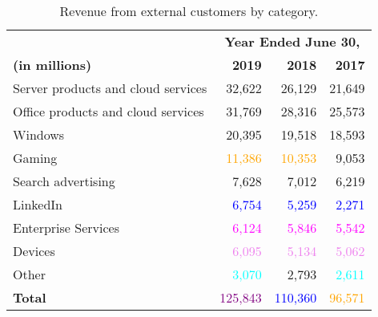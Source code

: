 \documentclass{article}
\begin{document}
\begin{table}[h]
    \centering
    \renewcommand{\arraystretch}{1.2}
    \begin{tabular}{lrrr}
        \toprule
        & \multicolumn{3}{c}{\textbf{Year Ended June 30,}} \\
        \textbf{(in millions)}& \textbf{2019} & \textbf{2018} & \textbf{2017} \\
        \midrule
        Server products and cloud services & 32,622 & 26,129 & 21,649 \\
        Office products and cloud services & 31,769 & 28,316 & 25,573 \\
        Windows & 20,395 & 19,518 & 18,593 \\
        Gaming & \textcolor{orange}{11,386} & \textcolor{orange}{10,353} & 9,053 \\
        Search advertising & 7,628 & 7,012 & 6,219 \\
        LinkedIn & \textcolor{blue}{6,754} & \textcolor{blue}{5,259} & \textcolor{blue}{2,271} \\
        Enterprise Services & \textcolor{magenta}{6,124} & \textcolor{magenta}{5,846} & \textcolor{magenta}{5,542} \\
        Devices & \textcolor{violet}{6,095} & \textcolor{violet}{5,134} & \textcolor{violet}{5,062} \\
        Other & \textcolor{cyan}{3,070} & 2,793 & \textcolor{cyan}{2,611} \\
        \midrule
        \textbf{Total} & \textcolor{purple}{125,843} & \textcolor{blue}{110,360} & \textcolor{orange}{96,571} \\
        \bottomrule
    \end{tabular}
    \caption{Revenue from external customers by category.}
\end{table}
\end{document}
